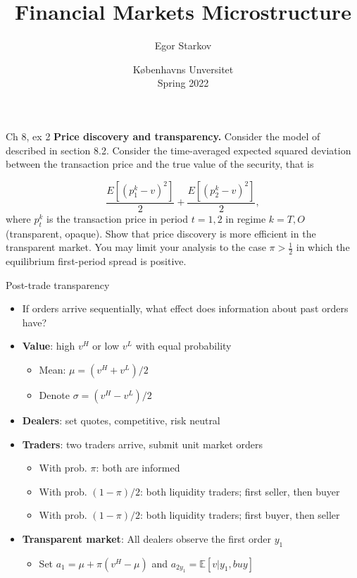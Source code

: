 \documentclass[english,10pt
,aspectratio=169
]{beamer}
\title{Financial Markets Microstructure}
\author{Egor Starkov}
\date{K{\o}benhavns Unversitet \\
	Spring 2022}
\begin{document}
	

\begin{frame}{Ch 8, ex 2}
	\textbf{Price discovery and transparency. }Consider the model of
	 described in section 8.2. Consider the time-averaged
	expected squared deviation between the transaction price and the true value
	of the security, that is
	
	\begin{equation*}
		\frac{E\left[ (p_{1}^{k}-v)^{2}\right] }{2}+\frac{E\left[ (p_{2}^{k}-v)^{2}%
			\right] }{2},
	\end{equation*}%
	where $p_{t}^{k}$ is the transaction price in period $t=1,2$ in regime $%
	k=T,O $ (transparent, opaque). Show that price discovery is more efficient
	in the transparent market. You may limit your analysis to the case $\pi >%
	\frac{1}{2} $ in which the equilibrium first-period spread is positive.
\end{frame}


\begin{frame}{Post-trade transparency}
	\begin{itemize}
		\item If orders arrive sequentially, what effect does information about \alert{past orders} have?
		\item \textbf{Value}: high $v^H$ or low $v^L$ with equal probability
		\begin{itemize}
			\item Mean: $\mu=(v^H+v^L)/2$
			\item \alert{Denote} $\sigma = (v^H-v^L)/2$
		\end{itemize}
		\item \textbf{Dealers}: set quotes, competitive, risk neutral
		\item \textbf{Traders}: two traders arrive, submit unit market orders
		\begin{itemize}
			\item With prob. $\pi$: both are informed
			\item With prob. $(1-\pi)/2$: both liquidity traders;  first  seller, then buyer
			\item With prob. $(1-\pi)/2$: both liquidity traders;  first  buyer, then seller
		\end{itemize}
		\item \textbf{Transparent market}: All dealers observe the first order $y_1$
		\begin{itemize}
			\item Set $a_1=\mu+\pi(v^{H}-\mu)$ and $a_{2y_1}=\mathbb{E}[v|y_1,buy]$
		\end{itemize}
	\end{itemize}
\end{frame}
\end{document}
